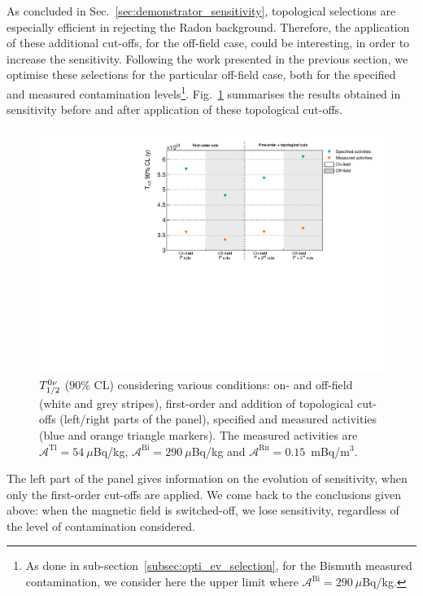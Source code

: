 As concluded in Sec.~\ref{sec:demonstrator_sensitivity}, topological selections are especially efficient in rejecting the Radon background.
Therefore, the application of these additional cut-offs, for the off-field case, could be interesting, in order to increase the sensitivity.
Following the work presented in the previous section, we optimise these selections for the particular off-field case, both for the specified and measured contamination levels\footnote{As done in sub-section~\ref{subsec:opti_ev_selection}, for the Bismuth measured contamination, we consider here the upper limit where $\mathcal{A}^{\text{Bi}}=290~\mu$Bq/kg.}.
Fig.~\ref{fig:sensitivity_B} summarises the results obtained in sensitivity before and after application of these topological cut-offs.
\begin{figure}[h!]
  \centering
  \includegraphics[width=1.1\textwidth]{Sensitivity/fig_sensitivity/contamination_Se_w_woB.pdf}
  \caption{$T_{1/2}^{0\nu}$ ($90$\% CL) considering various conditions: on- and off-field (white and grey stripes), first-order and addition of topological cut-offs (left/right parts of the panel), specified and measured activities (blue and orange triangle markers).
    The measured activities are $\mathcal{A}^{\text{Tl}}=54~\mu$Bq/kg, $\mathcal{A}^{\text{Bi}}=290~\mu$Bq/kg and $\mathcal{A}^{\text{Rn}} = 0.15$~mBq/m$^{3}$.
    \label{fig:sensitivity_B}}
\end{figure}
The left part of the panel gives information on the evolution of sensitivity, when only the first-order cut-offs are applied.
We come back to the conclusions given above: when the magnetic field is switched-off, we lose sensitivity, regardless of the level of contamination considered.
